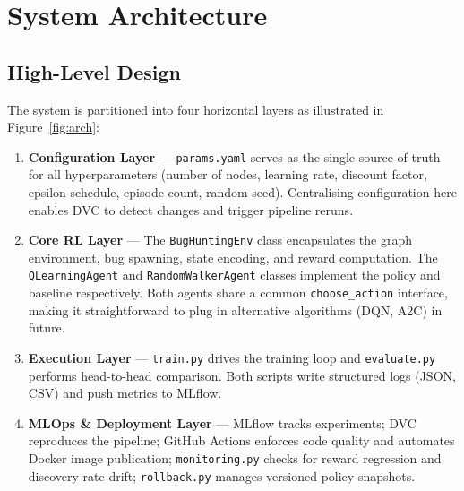 \documentclass[12pt,a4paper]{report}
\begin{document}
\chapter{System Architecture}

\section{High-Level Design}

The system is partitioned into four horizontal layers as illustrated in
Figure~\ref{fig:arch}:

\begin{enumerate}[leftmargin=1.5em, label=\textbf{\arabic*.}]

  \item \textbf{Configuration Layer} --- \texttt{params.yaml} serves as
        the single source of truth for all hyperparameters (number of
        nodes, learning rate, discount factor, epsilon schedule, episode
        count, random seed).  Centralising configuration here enables
        DVC to detect changes and trigger pipeline reruns.

  \item \textbf{Core RL Layer} --- The \texttt{BugHuntingEnv} class
        encapsulates the graph environment, bug spawning, state encoding,
        and reward computation.  The \texttt{QLearningAgent} and
        \texttt{RandomWalkerAgent} classes implement the policy and
        baseline respectively.  Both agents share a common
        \texttt{choose\_action} interface, making it straightforward to
        plug in alternative algorithms (DQN, A2C) in future.

  \item \textbf{Execution Layer} --- \texttt{train.py} drives the
        training loop and \texttt{evaluate.py} performs head-to-head
        comparison.  Both scripts write structured logs (JSON, CSV) and
        push metrics to MLflow.

  \item \textbf{MLOps \& Deployment Layer} --- MLflow tracks
        experiments; DVC reproduces the pipeline; GitHub Actions enforces
        code quality and automates Docker image publication;
        \texttt{monitoring.py} checks for reward regression and discovery
        rate drift; \texttt{rollback.py} manages versioned policy
        snapshots.

\end{enumerate}
\end{document}
